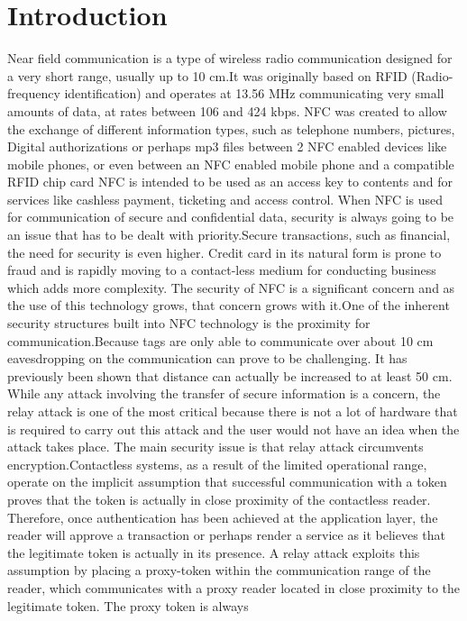 \documentclass[conference]{IEEEtran}
\begin{document}
\section{Introduction}
Near field communication is a type of wireless radio communication designed for a  very short range, usually up to 10 cm.It was originally based on RFID (Radio-frequency identification) and operates at 13.56 MHz communicating very small amounts of data, at rates between 106 and 424 kbps. NFC was created to allow the exchange of different information types, such as
telephone numbers, pictures, Digital authorizations or perhaps mp3 files between 2 NFC
enabled devices like mobile phones, or even between an NFC enabled mobile phone and a compatible RFID chip card  NFC is intended
to be used as an access key to contents and for services like cashless payment, ticketing and access control. When NFC is used for communication of secure and confidential data, security is always going to be an issue that has to be dealt with priority.Secure transactions, such as financial, the need for security is even higher. Credit card in its natural form is prone to fraud and is rapidly moving to a contact-less medium for conducting business which adds more complexity. The security of NFC is a significant concern and as the use of this technology grows, that concern grows with it.One of the inherent security structures built into NFC technology is the proximity for communication.Because tags are only able to communicate over about 10 cm eavesdropping on the communication can prove to be challenging. It has previously been shown that distance can actually be increased to at least 50 cm. While any attack involving the transfer of secure information is a concern, the relay attack is one of the most critical because there is not a lot of hardware that is required to carry out this attack and the user would not have an idea when the attack takes place. The main security issue is that relay attack circumvents encryption.Contactless systems,
as a result of the limited operational range, operate
on the implicit assumption that successful communication
with a token proves that the token is actually in close proximity of the contactless reader. Therefore, once authentication
has been achieved at the application layer, the reader
will approve a transaction or perhaps render a service as it believes that the legitimate token is actually in its presence. A relay
attack exploits this assumption by placing a proxy-token
within the communication range of the reader, which
communicates with a proxy reader located in close proximity to the legitimate token. The proxy token is always
\end{document}
